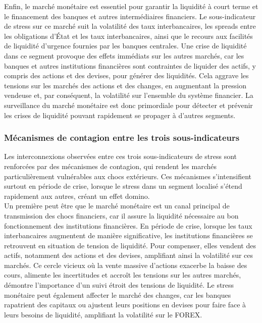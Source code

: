 \begin{sloppypar}
Enfin, le marché monétaire est essentiel pour garantir la liquidité à court terme et le financement des banques et autres intermédiaires financiers. Le sous-indicateur de stress sur ce marché suit la volatilité des taux interbancaires, les spreads entre les obligations d'État et les taux interbancaires, ainsi que le recours aux facilités de liquidité d'urgence fournies par les banques centrales. Une crise de liquidité dans ce segment provoque des effets immédiats sur les autres marchés, car les banques et autres institutions financières sont contraintes de liquider des actifs, y compris des actions et des devises, pour générer des liquidités. Cela aggrave les tensions sur les marchés des actions et des changes, en augmentant la pression vendeuse et, par conséquent, la volatilité sur l'ensemble du système financier. La surveillance du marché monétaire est donc primordiale pour détecter et prévenir les crises de liquidité pouvant rapidement se propager à d'autres segments.

\subsubsection{Mécanismes de contagion entre les trois sous-indicateurs}

Les interconnexions observées entre ces trois sous-indicateurs de stress sont renforcées par des mécanismes de contagion, qui rendent les marchés particulièrement vulnérables aux chocs extérieurs. Ces mécanismes s'intensifient surtout en période de crise, lorsque le stress dans un segment localisé s'étend rapidement aux autres, créant un effet domino.\\

Un première peut être que le marché monétaire est un canal principal de transmission des chocs financiers, car il assure la liquidité nécessaire au bon fonctionnement des institutions financières. En période de crise, lorsque les taux interbancaires augmentent de manière significative, les institutions financières se retrouvent en situation de tension de liquidité. Pour compenser, elles vendent des actifs, notamment des actions et des devises, amplifiant ainsi la volatilité sur ces marchés. Ce cercle vicieux où la vente massive d’actions exacerbe la baisse des cours, alimente les incertitudes et accroît les tensions sur les autres marchés, démontre l’importance d’un suivi étroit des tensions de liquidité. Le stress monétaire peut également affecter le marché des changes, car les banques rapatrient des capitaux ou ajustent leurs positions en devises pour faire face à leurs besoins de liquidité, amplifiant la volatilité sur le FOREX.\\


\end{sloppypar}
